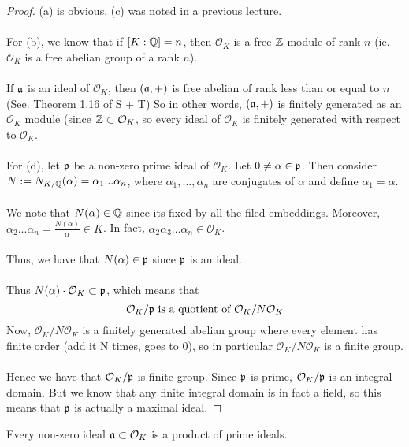 \begin{proof}
(a) is obvious, (c) was noted in a previous lecture.\\\\
For (b), we know that if $[K: \mathbb{Q}] = n$, then $\mathcal{O}_K$ is a free $\mathbb{Z}$-module of rank $n$ (ie. $\mathcal{O}_K$ is a free abelian group of a rank $n$).\\\\
If $\mathfrak{a}$ is an ideal of $\mathcal{O}_K$, then $(\mathfrak{a}, +)$ is free abelian of rank less than or equal to $n$ (See. Theorem 1.16 of S + T) So in other words, $(\mathfrak{a}, +)$ is finitely generated as an $\mathcal{O}_K$ module (since $\mathbb{Z} \subset \mathcal{O}_K$, so every ideal of $\mathcal{O}_K$ is finitely generated with respect to $\mathcal{O}_K$.\\\\
For (d), let $\mathfrak{p}$ be a non-zero prime ideal of $\mathcal{O}_K$. Let $0 \neq \alpha \in \mathfrak{p}$. Then consider $N := N_{K/\mathbb{Q}}(\alpha) = \alpha_1 ... \alpha_n$, where $\alpha_1, ..., \alpha_n$ are conjugates of $\alpha$ and define $\alpha_1 = \alpha$.\\\\
We note that $N(\alpha) \in \mathbb{Q}$ since its fixed by all the filed embeddings. Moreover, $\alpha_2 ... \alpha_n = \frac{N(\alpha)}{\alpha} \in K$. In fact, $\alpha_2\alpha_3...\alpha_n \in \mathcal{O}_K$.\\\\
Thus, we have that $N(\alpha) \in \mathfrak{p}$ since $\mathfrak{p}$ is an ideal.\\\\
Thus $N(\alpha) \cdot \mathcal{O}_K \subset \mathfrak{p}$, which means that
\[\mathcal{O}_K/\mathfrak{p} \text{ is a quotient of } \mathcal{O}_K/N \mathcal{O}_K\]
Now, $\mathcal{O}_K/N \mathcal{O}_K$ is a finitely generated abelian group where every element has finite order (add it N times, goes to 0), so in particular $\mathcal{O}_K/N \mathcal{O}_K$ is a finite group.\\\\
Hence we have that $\mathcal{O}_K/\mathfrak{p}$ is finite group. Since $\mathfrak{p}$ is prime, $\mathcal{O}_K/\mathfrak{p}$ is an integral domain. But we know that any finite integral domain is in fact a field, so this means that $\mathfrak{p}$ is actually a maximal ideal.
\end{proof}

\begin{proposition}
Every non-zero ideal $\mathfrak{a} \subset \mathcal{O}_K$ is a product of prime ideals.
\end{proposition}

